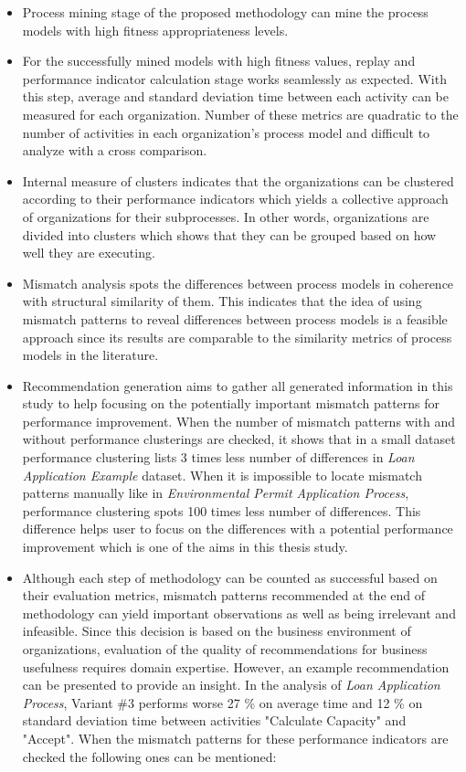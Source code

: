 \begin{itemize}
	\item Process mining stage of the proposed methodology can mine the process models with high fitness appropriateness levels.
	\item For the successfully mined models with high fitness values, replay and performance indicator calculation stage works seamlessly as expected. With this step, average and standard deviation time between each activity can be measured for each organization. Number of these metrics are quadratic to the number of activities in each organization's process model and difficult to analyze with a cross comparison.
	\item Internal measure of clusters indicates that the organizations can be clustered according to their performance indicators which yields a collective approach of organizations for their subprocesses. In other words, organizations are divided into clusters which shows that they can be grouped based on how well they are executing.
	\item Mismatch analysis spots the differences between process models in coherence with structural similarity of them. This indicates that the idea of using mismatch patterns to reveal differences between process models is a feasible approach since its results are comparable to the similarity metrics of process models in the literature.
	\item Recommendation generation aims to gather all generated information in this study to help focusing on the potentially important mismatch patterns for performance improvement. When the number of mismatch patterns with and without performance clusterings are checked, it shows that in a small dataset performance clustering lists 3 times less number of differences in \textit{Loan Application Example} dataset. When it is impossible to locate mismatch patterns manually like in \textit{Environmental Permit Application Process}, performance clustering spots 100 times less number of differences. This difference helps user to focus on the differences with a potential performance improvement which is one of the aims in this thesis study.
	\item Although each step of methodology can be counted as successful based on their evaluation metrics, mismatch patterns recommended at the end of methodology can yield important observations as well as being irrelevant and infeasible. Since this decision is based on the business environment of organizations, evaluation of the quality of recommendations for business usefulness requires domain expertise. However, an example recommendation can be presented to provide an insight. In the analysis of \textit{Loan Application Process}, Variant \#3 performs worse 27 \%  on average time and 12 \% on standard deviation time between activities "Calculate Capacity" and "Accept". When the mismatch patterns for these performance indicators are checked the following ones can be mentioned:

\end{itemize}

